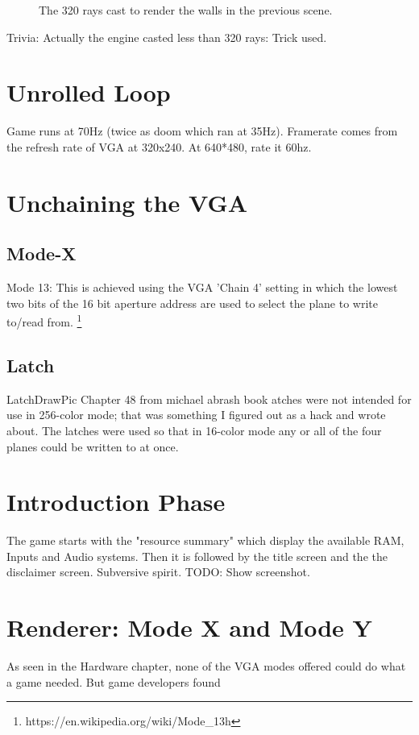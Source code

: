 \begin{figure}[H]
\centering
 
 \caption{The 320 rays cast to render the walls in the previous scene.} \label{fig:Raycasting2}
\end{figure}
 
Trivia: Actually the engine casted less than 320 rays: Trick used.
 

\section{Unrolled Loop}
Game runs at 70Hz (twice as doom which ran at 35Hz). Framerate comes from the refresh rate of VGA at 320x240. At 640*480, rate it 60hz.




\section{Unchaining the VGA}
\subsection{Mode-X}
Mode 13: This is achieved using the VGA 'Chain 4' setting in which the lowest two bits of the 16 bit aperture address are used to select the plane to write to/read from. \footnote{https://en.wikipedia.org/wiki/Mode\_13h}
\subsection{Latch}
LatchDrawPic
Chapter 48 from michael abrash book
atches were not intended for use in 256-color mode; that was something I figured out as a hack and wrote about. The latches were used so that in 16-color mode any or all of the four planes could be written to at once.






\section{Introduction Phase}


The game starts with the "resource summary" which display the available RAM, Inputs and Audio systems. Then it is followed by the title screen and the the disclaimer screen. Subversive spirit.
TODO: Show screenshot.

\section{Renderer: Mode X and Mode Y}
As seen in the Hardware chapter, none of the VGA modes offered could do what a game needed. But game developers found

